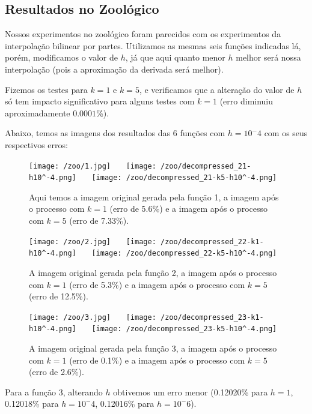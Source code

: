 \documentclass{article}
\begin{document}
		\subsection{Resultados no Zoológico}
		Nossos experimentos no zoológico foram parecidos com os experimentos da interpolação bilinear por partes. Utilizamos as mesmas seis funções indicadas lá, porém, modificamos o valor de $h$, já que aqui quanto menor $h$ melhor será nossa interpolação (pois a aproximação da derivada será melhor). \par
		Fizemos os testes para $k = 1$ e $k = 5$, e verificamos que a alteração do valor de $h$ só tem impacto significativo para alguns testes com $k = 1$ (erro diminuiu aproximadamente $0.0001$\%). \par
		Abaixo, temos as imagens dos resultados das 6 funções com $h = 10^-4$ com os seus respectivos erros:
		
		\begin{figure}[H]
			\centering
			\captionsetup{justification=centering}
			\texttt{[image: /zoo/1.jpg]} \ \ \
			\texttt{[image: /zoo/decompressed\_21-h10^-4.png]} \ \ \
			\texttt{[image: /zoo/decompressed\_21-k5-h10^-4.png]} \\
			\caption{Aqui temos a imagem original gerada pela função 1, a imagem após o processo com $k = 1$ (erro de 5.6\%) e a imagem após o processo com $k = 5$ (erro de 7.33\%).}  
		\end{figure}\par
		
		\begin{figure}[H]
			\centering
			\captionsetup{justification=centering}
			\texttt{[image: /zoo/2.jpg]} \ \ \
			\texttt{[image: /zoo/decompressed\_22-k1-h10^-4.png]} \ \ \
			\texttt{[image: /zoo/decompressed\_22-k5-h10^-4.png]} \\
			\caption{A imagem original gerada pela função 2, a imagem após o processo com $k = 1$ (erro de 5.3\%) e a imagem após o processo com $k = 5$ (erro de 12.5\%).}  
		\end{figure}\par
		
		\begin{figure}[H]
			\centering
			\captionsetup{justification=centering}
			\texttt{[image: /zoo/3.jpg]} \ \ \
			\texttt{[image: /zoo/decompressed\_23-k1-h10^-4.png]} \ \ \
			\texttt{[image: /zoo/decompressed\_23-k5-h10^-4.png]} \\
			\caption{A imagem original gerada pela função 3, a imagem após o processo com $k = 1$ (erro de 0.1\%) e a imagem após o processo com $k = 5$ (erro de 2.6\%).}  
		\end{figure}\par
		Para a função 3, alterando $h$ obtivemos um erro menor (0.12020\% para $h = 1$, 0.12018\% para $h = 10^-4$, 0.12016\% para $h = 10^-6$).
		
\end{document}
